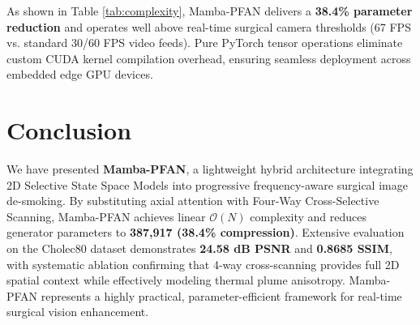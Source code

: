 \documentclass[conference]{IEEEtran}
\begin{document}
As shown in Table \ref{tab:complexity}, Mamba-PFAN delivers a \textbf{38.4\% parameter reduction} and operates well above real-time surgical camera thresholds (67 FPS vs. standard 30/60 FPS video feeds). Pure PyTorch tensor operations eliminate custom CUDA kernel compilation overhead, ensuring seamless deployment across embedded edge GPU devices.

\section{Conclusion}
We have presented \textbf{Mamba-PFAN}, a lightweight hybrid architecture integrating 2D Selective State Space Models into progressive frequency-aware surgical image de-smoking. By substituting axial attention with Four-Way Cross-Selective Scanning, Mamba-PFAN achieves linear $\mathcal{O}(N)$ complexity and reduces generator parameters to \textbf{387,917 (38.4\% compression)}. Extensive evaluation on the Cholec80 dataset demonstrates \textbf{24.58 dB PSNR} and \textbf{0.8685 SSIM}, with systematic ablation confirming that 4-way cross-scanning provides full 2D spatial context while effectively modeling thermal plume anisotropy. Mamba-PFAN represents a highly practical, parameter-efficient framework for real-time surgical vision enhancement.
\end{document}
